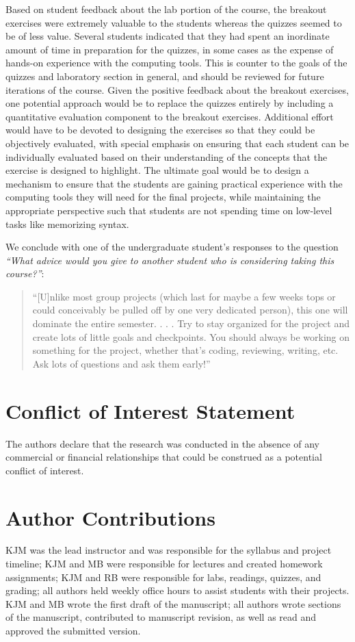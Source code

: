 Based on student feedback about the lab portion of the course, the breakout
exercises were extremely valuable to the students whereas the quizzes seemed
to be of less value.
Several students indicated that they had spent an inordinate amount of time in
preparation for the quizzes, in some cases as the expense of hands-on
experience with the computing tools.
This is counter to the goals of the quizzes and laboratory section in general,
and should be reviewed for future iterations of the course.
Given the positive feedback about the breakout exercises, one potential
approach would be to replace the quizzes entirely by including a quantitative
evaluation component to the breakout exercises.
Additional effort would have to be devoted to designing the exercises so that
they could be objectively evaluated, with special emphasis on ensuring that
each student can be individually evaluated based on their understanding of the
concepts that the exercise is designed to highlight.
The ultimate goal would be to design a mechanism to ensure that the students
are gaining practical experience with the computing tools they will need for
the final projects, while maintaining the appropriate perspective such that
students are not spending time on low-level tasks like memorizing syntax.

We conclude with one of the undergraduate student's responses to the question
\emph{``What advice would you give to another student who is considering taking this course?''}:
\begin{quotation}
``[U]nlike most group projects (which last for maybe a few weeks tops or
could conceivably be pulled off by one very dedicated person), this one will
dominate the entire semester. . . . Try to stay organized for the project and
create lots of little goals and checkpoints. You should always be working on
something for the project, whether that's coding, reviewing, writing, etc. Ask
lots of questions and ask them early!''
\end{quotation}



\section*{Conflict of Interest Statement}

The authors declare that the research was conducted in the absence of any
commercial or financial relationships that could be construed as a potential
conflict of interest.

\section*{Author Contributions}

KJM was the lead instructor and was responsible for the syllabus and project timeline;
KJM and MB were responsible for lectures and created homework assignments;
KJM and RB were responsible for labs, readings, quizzes, and grading;
all authors held weekly office hours to assist students with their projects.
KJM and MB wrote the first draft of the manuscript;
all authors wrote sections of the manuscript, contributed to manuscript revision, 
as well as read and approved the submitted version.
